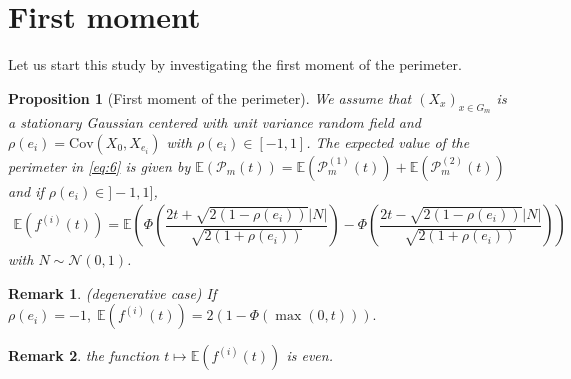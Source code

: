 \documentclass[12pt]{article}
\theoremstyle{Theorem}
\newtheorem{Proposition}[Theorem]{Proposition}
\newtheorem{remark}{Remark}
\begin{document}
\section{First moment}
Let us start this study by investigating the first moment of the perimeter.
\begin{Proposition}[First moment of the perimeter] 
\label{propFisrtmoment}
We assume that $\left(X_x \right)_{x \in G_{m}}$ is a stationary Gaussian centered with unit variance random field and $\rho(e_i) = \text{Cov}\left(X_{\scriptscriptstyle 0}, X_{e_i}\right)$ with $\rho(e_i) \in [-1, 1]$. The expected value of the perimeter in \eqref{eq:6} is  given \linebreak by $\mathbb{E}\left(\mathcal{P}_{m}(t)\right) = \mathbb{E}\left(\mathcal{P}^{\scriptscriptstyle  (1)}_{m}(t)\right) + \mathbb{E}\left(\mathcal{P}^{\scriptscriptstyle  (2)}_{m}(t)\right)$  and
if $\rho(e_{i}) \in ]-1,1]$, 
{\small
\begin{align}
\label{propEquationFisrtmoment}
\mathbb{E}\left(f^{(i)}(t) \right) = \mathbb{E}\left(\Phi\left(\dfrac{2t + \sqrt{2(1-\rho(e_i))}|N|}{\sqrt{2(1+\rho(e_i))}}\right)  - \Phi\left(\dfrac{2t - \sqrt{2(1-\rho(e_i))}|N|}{\sqrt{2(1+\rho(e_i))}}\right)\right)
\end{align}}
with $N \sim \mathcal{N}(0,1)$. 
\end{Proposition}
\begin{remark}(degenerative case)
If  $\rho(e_i) = -1, \; \mathbb{E}\left(f^{(i)}(t) \right)= 2\left(1 - \Phi\left(\max\left(0,t\right)\right)\right).$
\end{remark}
\begin{remark}
the function $t \mapsto \mathbb{E}\left(f^{(i)}(t) \right)$ is even.
\end{remark}
\end{document}
